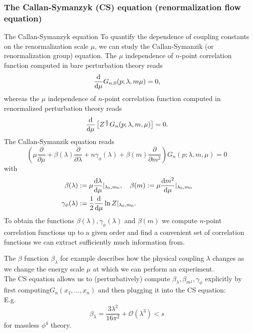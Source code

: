 \subsubsection{The Callan-Symanzyk (CS) equation (renormalization flow equation)}
\begin{mybox}{The Callan-Symanzyk equation}
	To quantify the dependence of coupling constants on the renormalization scale $\mu$, we can study the Callan-Symanzik (or renormalization group) equation. The $\mu$ independence of $n$-point correlation function computed in bare perturbation theory reads 
	\begin{equation}
		\frac{\mathrm{d}}{\mathrm{d} \mu} G_{n,0} (p;\lambda,m\mu) = 0,
	\end{equation}
	whereas the $\mu$ independence of $n$-point correlation function computed in renormalized perturbation theory reads
	\begin{equation}
		\frac{\mathrm{d} }{\mathrm{d} \mu} \left[Z^{\frac{n}{2}} G_n(p;\lambda,m,\mu)\right] =0.
	\end{equation}
	The Callan-Symanzik equation reads
	\begin{equation}
		\label{eq:callansymanzik}
		\left(\mu \frac{\partial}{\partial \mu} + \beta(\lambda) \frac{\partial}{\partial \lambda} + n \gamma_{\phi}(\lambda) + \beta(m) \frac{\partial}{\partial m^2}\right) G_n(p;\lambda,m,\mu) =0
	\end{equation}
	with 
	\begin{align}
		\beta(\lambda) &:= \mu \frac{\mathrm{d} \lambda}{\mathrm{d} \mu} |_{\lambda_0,m_0}, \quad \beta(m) := \mu \frac{\mathrm{d} m^2}{\mathrm{d} \mu} |_{\lambda_0,m_0}\\
		\gamma_{\phi}(\lambda)&:= \frac{1}{2} \frac{\mathrm{d}}{\mathrm{d} \mu} \ln Z |_{\lambda_0,m_0}.
	\end{align}
To obtain the functions $\beta(\lambda),\gamma_{\phi}(\lambda)$ and $\beta(m)$ we compute $n$-point correlation functions up to a given order and find a convenient set of correlation functions we can extract sufficiently much information from.
\end{mybox}
\begin{mybox}{The $\beta$ function}
	$\beta_{\lambda}$ for example describes how the physical coupling $\lambda$ changes as we change the energy scale $\mu$ at which we can perform an experiment.\\
	The CS equation allows us to (perturbatively) compute $\beta_{\lambda},\beta_{m^2},\gamma_{\phi}$ explicitly by first computing$G_n(x_1,\dots,x_n)$ and then plugging it into the CS equation:\\
	E.g. \begin{equation}
		\beta_{\lambda} = \frac{3\lambda^2}{16 \pi^2} + \mathcal{O}(\lambda^3)<s
	\end{equation}
	for massless $\phi^4$ theory.
\end{mybox}
